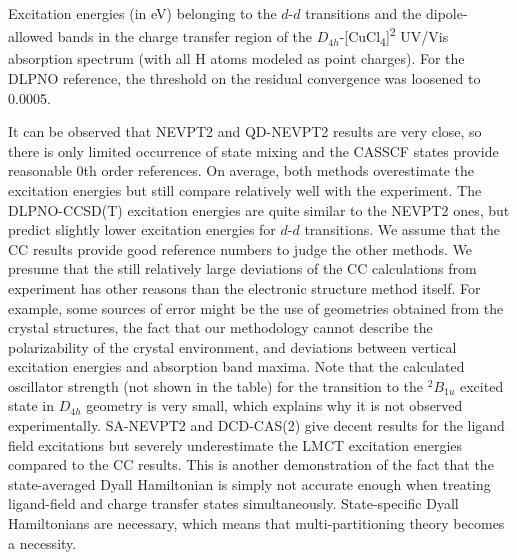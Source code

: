 \begin{table}
\small
\centering
\ttabbox
{\caption[Excitation energies belonging to the $d$-$d$ and charge transfer transitions of $D_{4h}$-{[CuCl\textsubscript{4}]}\textsuperscript{2\textminus}.]{Excitation energies (in eV) belonging to the $d$-$d$ transitions and the dipole-allowed bands in the charge transfer region of the $D_{4h}$-[CuCl\textsubscript{4}]\textsuperscript{2\textminus} UV/Vis absorption spectrum (with all H atoms modeled as point charges). For the DLPNO reference, the threshold on the residual convergence was loosened to 0.0005.}
\label{Tab:D4h_excitations}}
{
}
\end{table}
It can be observed that NEVPT2 and QD-NEVPT2 results are very close, so there is only limited occurrence of state mixing and the CASSCF states provide reasonable 0th order references. On average, both methods overestimate the excitation energies but still compare relatively well with the experiment. The DLPNO-CCSD(T) excitation energies are quite similar to the NEVPT2 ones, but predict slightly lower excitation energies for $d$-$d$ transitions. We assume that the CC results provide good reference numbers to judge the other methods. We presume that the still relatively large deviations of the CC calculations from experiment has other reasons than the electronic structure method itself. For example, some sources of error might be the use of geometries obtained from the crystal structures, the fact that our methodology cannot describe the polarizability of the crystal environment, and deviations between vertical excitation energies and absorption band maxima. 
Note that the calculated oscillator strength (not shown in the table) for the transition to the $^2B_{1u}$ excited state in $D_{4h}$ geometry is very small, which explains why it is not observed experimentally.
SA-NEVPT2 and DCD-CAS(2) give decent results for the ligand field excitations but severely underestimate the LMCT excitation energies compared to the CC results. This is another demonstration of the fact that the state-averaged Dyall Hamiltonian is simply not accurate enough when treating ligand-field and charge transfer states simultaneously. State-specific Dyall Hamiltonians are necessary, which means that multi-partitioning theory becomes a necessity.

